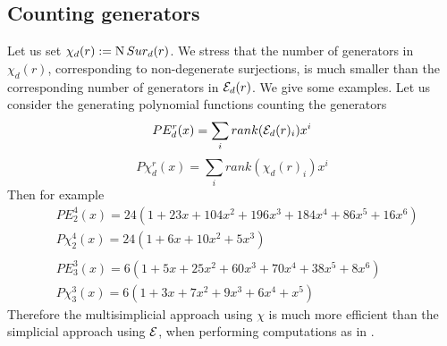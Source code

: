 \subsection{Counting generators}

Let us set $\chi_d(r):=\operatorname{N}Sur_{d}(r)$. We stress that the number of generators in $\chi_d(r)$, corresponding to non-degenerate surjections, is much smaller than the corresponding number of generators in $\mathcal{E}_d(r)$.
We give some examples.
Let us consider the generating polynomial functions counting the generators
$$PE_d^r(x) = \sum_i rank(\mathcal{E}_d(r)_i) x^i $$ $$P\chi_d^r(x)=
\sum_i rank(\chi_d(r)_i) x^i$$
Then for example
\begin{align*}
	& PE_2^4(x)=24(1+23x+104x^2+196x^3+184x^4+86x^5+16x^6)\\
	& P\chi_2^4(x)=24(1+6x+10x^2+5x^3) \\
	& \\
	& PE_3^3(x) = 6(1+5x+25x^2+60x^3+70x^4+38x^5+8x^6 ) \\
	& P\chi_3^3(x)= 6(1+3x+7x^2+9x^3+6x^4+x^5)
\end{align*}
Therefore the multisimplicial approach using $\chi$ is much more efficient than the simplicial
approach using $\mathcal{E}$, when performing computations as in \cite{salvatore2020planarnonformality}.